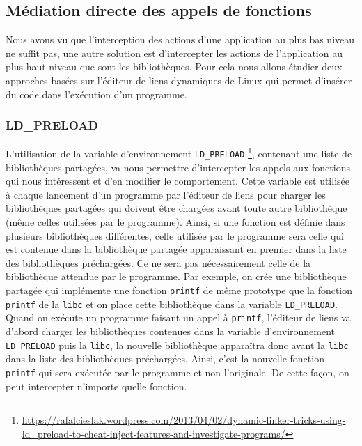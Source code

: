 \subsection{Médiation directe des appels de fonctions}

Nous avons vu que l'interception des actions d'une application au plus bas
niveau ne suffit pas, une autre solution est d'intercepter les actions de
l'application au plus haut niveau que sont les bibliothèques. Pour cela nous
allons étudier deux approches basées sur l'éditeur de liens dynamiques de Linux
qui permet d'insérer du code dans l'exécution d'un programme.

\subsubsection{LD\_PRELOAD}
\label{paragraphe:LDPreload}

L'utilisation de la variable d'environnement \texttt{LD\_PRELOAD}
\footnote{\url{https://rafalcieslak.wordpress.com/2013/04/02/dynamic-linker-tricks-using-ld\_preload-to-cheat-inject-features-and-investigate-programs/}}, contenant une liste de bibliothèques partagées, va nous
permettre d'intercepter les appels aux fonctions qui nous intéressent et d'en
modifier le comportement. Cette variable est utilisée à chaque lancement d'un
programme par l'éditeur de liens pour charger les bibliothèques partagées qui
doivent être chargées avant toute autre bibliothèque (même celles utilisées par
le programme). Ainsi, si une fonction est définie dans plusieurs bibliothèques
différentes, celle utilisée par le programme sera celle qui est contenue dans la
bibliothèque partagée apparaissant en premier dans la liste des bibliothèques
préchargées. Ce ne sera pas nécessairement celle de la bibliothèque
attendue par le programme. Par exemple, on crée une bibliothèque partagée qui
implémente une fonction \texttt{printf} de même prototype que la
fonction \texttt{printf} de la \texttt{libc} et on place cette bibliothèque dans la
variable \texttt{LD\_PRELOAD}. Quand on exécute un programme faisant un appel
à \texttt{printf}, l'éditeur de liens va d'abord charger les bibliothèques
contenues dans la variable d'environnement \texttt{LD\_PRELOAD} puis la \texttt{libc}, la
nouvelle bibliothèque apparaîtra donc avant la \texttt{libc} dans la liste des
bibliothèques préchargées. Ainsi, c'est la nouvelle fonction \texttt{printf}
qui sera exécutée par le programme et non l'originale. De cette façon, on peut
intercepter n'importe quelle fonction.

